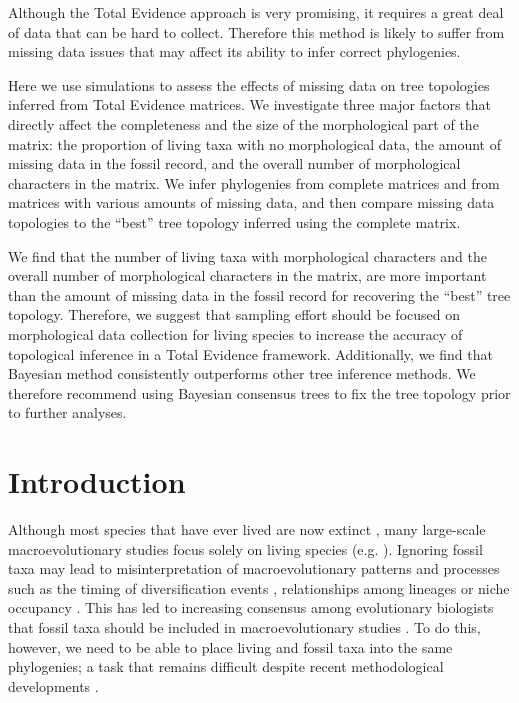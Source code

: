 Although the Total Evidence approach is very promising, it requires a great deal of data that can be hard to collect.
Therefore this method is likely to suffer from missing data issues that may affect its ability to infer correct phylogenies.

Here we use simulations to assess the effects of missing data on tree topologies inferred from Total Evidence matrices.
We investigate three major factors that directly affect the completeness and the size of the morphological part of the matrix: the proportion of living taxa with no morphological data, the amount of missing data in the fossil record, and the overall number of morphological characters in the matrix.
We infer phylogenies from complete matrices and from matrices with various amounts of missing data, and then compare missing data topologies to the ``best'' tree topology inferred using the complete matrix.

We find that the number of living taxa with morphological characters and the overall number of morphological characters in the matrix, are more important than the amount of missing data in the fossil record for recovering the ``best'' tree topology.
Therefore, we suggest that sampling effort should be focused on morphological data collection for living species to increase the accuracy of topological inference in a Total Evidence framework.
Additionally, we find that Bayesian method consistently outperforms other tree inference methods.
We therefore recommend using Bayesian consensus trees to fix the tree topology prior to further analyses.

\bigskip

%
%

\newpage
\section{Introduction}
Although most species that have ever lived are now extinct \citep{novacek1992ext,raup1993extinction}, many large-scale macroevolutionary studies focus solely on living species (e.g. \citealp{meredithimpacts2011,jetzthe2012}).
Ignoring fossil taxa may lead to misinterpretation of macroevolutionary patterns and processes such as the timing of diversification events \citep[e.g.][]{pyrondivergence2011}, relationships among lineages \citep[e.g.][]{manosphylogeny2007} or niche occupancy \citep[e.g.][]{pearmanniche2008}.
This has led to increasing consensus among evolutionary biologists that fossil taxa should be included in macroevolutionary studies \citep{jacksonwhat2006,quentaldiversity2010,dietlconservation2011,slaterunifying2013,fritzdiversity2013}.
To do this, however, we need to be able to place living and fossil taxa into the same phylogenies; a task that remains difficult despite recent methodological developments \citep[e.g.][]{pyrondivergence2011,ronquista2012,BEASTmaster}.

